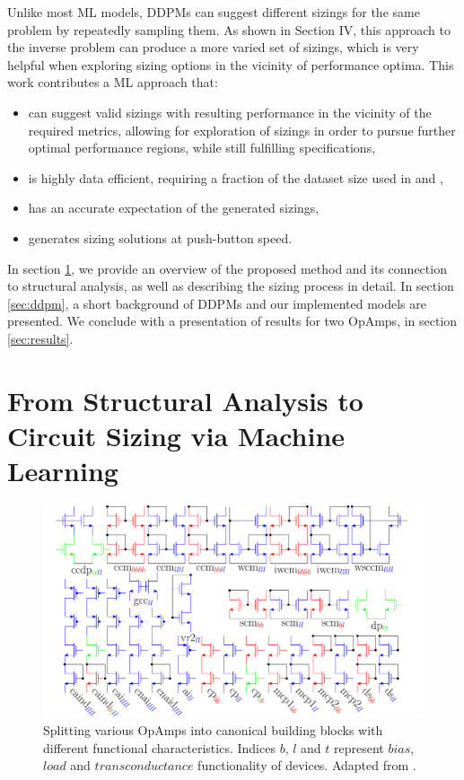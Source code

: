 \documentclass[conference]{IEEEtran}
\begin{document}
	Unlike most ML models, DDPMs can suggest different sizings for the same problem by repeatedly sampling them.
	As shown in Section IV, this approach to the inverse problem can produce a more varied set of sizings, which is very helpful when exploring sizing options in the vicinity of performance optima. 
This work contributes a ML approach that:
	\begin{itemize}
	\item can suggest valid sizings with resulting performance in the vicinity of the required metrics, allowing for exploration of sizings in order to pursue further optimal performance regions, while still fulfilling specifications,
	\item is highly data efficient, requiring a fraction of the dataset size used in \cite{eid24diffusion} and \cite{lourenco18},
	\item has an accurate expectation of the generated sizings,
	\item generates sizing solutions at push-button speed.
	\end{itemize}
	
 	In section \ref{sec:intro2}, we provide an overview of the proposed method and its connection to structural analysis, as well as describing the sizing process in detail. In section \ref{sec:ddpm}, a short background of DDPMs and our implemented models are presented. We conclude with a presentation of results for two OpAmps, in section \ref{sec:results}.

	 	
 	\section{From Structural Analysis to Circuit Sizing via Machine Learning}\label{sec:intro2}
	\begin{figure}[h]
		\centering
        \includegraphics[width=\linewidth]{figures/struct_overview_incl_partition}
		\setlength{\abovecaptionskip}{0ex}%
		\setlength{\belowcaptionskip}{-2ex}%
		\caption{Splitting various OpAmps into canonical building blocks with different functional characteristics. Indices {\color{red} $b$}, {\color{blue} $l$} and {\color{green} $t$} represent {\color{red}$bias$}, {\color{blue}$load$} and {\color{green}$transconductance$} functionality of devices. Adapted from \cite{leibl24inverse}.}
		\label{fig:overview-structure}
	\end{figure}
	\setlength{\abovecaptionskip}{1ex}%
	\setlength{\belowcaptionskip}{-3ex}%
\end{document}
